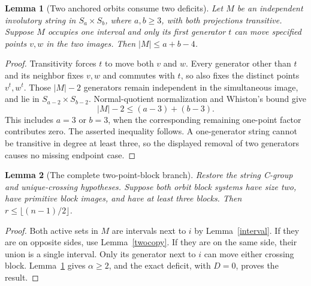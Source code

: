 \documentclass[11pt,a4paper]{article}
\newtheorem{lemma}{Lemma}
\begin{document}
\begin{lemma}[Two anchored orbits consume two deficits]\label{same-side}
Let $M$ be an independent involutory string in $S_a\times S_b$,
where $a,b\geq3$, with both projections transitive. Suppose $M$ occupies
one interval and only its first generator $t$ can move specified
points $v,w$ in the two images. Then $|M|\leq a+b-4$.
\end{lemma}
\begin{proof}
Transitivity forces $t$ to move both $v$ and $w$. Every generator
other than $t$ and its neighbor fixes $v,w$ and commutes with
$t$, so also fixes the distinct points $v^t,w^t$. Those
$|M|-2$ generators remain independent in the simultaneous image,
and lie in $S_{a-2}\times S_{b-2}$. Normal-quotient normalization
and Whiston's bound give
\[
 |M|-2\leq (a-3)+(b-3).
\]
This includes $a=3$ or $b=3$, when the corresponding remaining
one-point factor contributes zero. The asserted inequality
follows. A one-generator string cannot be transitive in degree
at least three, so the displayed removal of two generators
causes no missing endpoint case.
\end{proof}

\begin{lemma}[The complete two-point-block branch]\label{alltwocopy}
Restore the string C-group and unique-crossing hypotheses.
Suppose both orbit block systems have size two, have primitive
block images, and have at least three blocks. Then
$r\leq\lfloor(n-1)/2\rfloor$.
\end{lemma}
\begin{proof}
Both active sets in $M$ are intervals next to $i$ by
Lemma~\ref{interval}. If they are on opposite sides, use
Lemma~\ref{twocopy}. If they are on the same side, their union
is a single interval. Only its generator next to $i$ can move
either crossing block. Lemma~\ref{same-side} gives $\alpha\geq2$,
and the exact deficit, with $D=0$, proves the result.
\end{proof}
\end{document}
